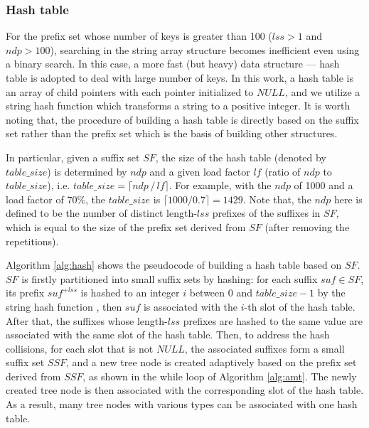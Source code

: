 \documentclass{article}
\begin{document}
\subsubsection{Hash table}
\label{sec:hash table}

For the prefix set whose number of keys is greater than 100 ($lss > 1$
and $ndp > 100$), searching in the string array structure becomes
inefficient even using a binary search. In this case, a more fast (but
heavy) data structure --- \textsf{hash table} is adopted to deal with
large number of keys. In this work, a hash table is an array of child
pointers with each pointer initialized to $NULL$, and we utilize a
\textsf{string hash function} which transforms a string to a positive
integer. It is worth noting that, the procedure of building a hash
table is directly based on the suffix set rather than the prefix set
which is the basis of building other structures.


In particular, given a suffix set $SF$, the size of the hash table
(denoted by $table\_size$) is determined by $ndp$ and a given
\textsf{load factor} $lf$ (ratio of $ndp$ to $table\_size$), i.e.
$table\_size = \lceil ndp\,/\,lf \rceil$. For example, with the $ndp$
of 1000 and a load factor of $70\%$, the $table\_size$ is
$\lceil 1000/0.7 \rceil = 1429$. Note that, the $ndp$ here is defined
to be the number of distinct length-$lss$ prefixes of the suffixes in
$SF$, which is equal to the size of the prefix set derived from $SF$
(after removing the repetitions).

Algorithm \ref{alg:hash} shows the pseudocode of building a hash table
based on $SF$. $SF$ is firstly partitioned into small suffix sets by
hashing: for each suffix $suf \in SF$, its prefix $suf^{+lss}$ is
hashed to an integer $i$ between 0 and $table\_size-1$ by the string
hash function , then $suf$ is associated with the $i$-th slot of the
hash table. After that, the suffixes whose length-$lss$ prefixes are
hashed to the same value are associated with the same slot of the hash
table. Then, to address the hash collisions, for each slot that is not
$NULL$, the associated suffixes form a small suffix set $SSF$, and a
new tree node is created adaptively based on the prefix set derived
from $SSF$, as shown in the \textsf{while} loop of Algorithm
\ref{alg:amt}. The newly created tree node is then associated with the
corresponding slot of the hash table. As a result, many tree nodes
with various types can be associated with one hash table.
\end{document}
